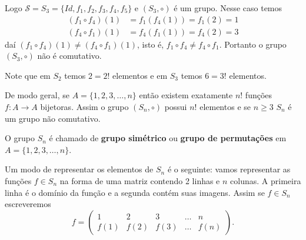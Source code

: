 Logo $\mathcal{S} = S_3 = \{Id, f_1, f_2, f_3, f_4, f_5\}$ e $(S_3, \circ)$ é um grupo. Nesse caso temos
\begin{align*}
    (f_1 \circ f_4)(1) &= f_1(f_4(1)) = f_1(2) = 1\\
    (f_4 \circ f_1)(1) &= f_4(f_1(1)) = f_4(2) = 3
\end{align*}
daí $(f_1 \circ f_4)(1) \ne (f_4 \circ f_1)(1)$, isto é, $f_1 \circ f_4 \ne f_4 \circ f_1$. Portanto o grupo $(S_3, \circ)$ não é comutativo.

Note que em $S_2$ temos $2 = 2!$ elementos e em $S_3$ temos $6 = 3!$ elementos.

De modo geral, se $A = \{1, 2, 3, \dots, n\}$ então existem exatamente $n!$ funções $f : A \to A$ bijetoras. Assim o grupo $(S_n, \circ)$ possui $n!$ elementos e se $n \geqslant 3$ $S_n$ é um grupo não comutativo.

\begin{definicao}
    O grupo $S_n$ é chamado de \textbf{grupo simétrico} ou \textbf{grupo de permutações} em $A = \{1, 2, 3, \dots, n\}$.
\end{definicao}


Um modo de representar os elementos de $S_n$ é o seguinte: vamos representar as funções $f \in S_n$ na forma de uma matriz contendo 2 linhas e $n$ colunas. A primeira linha é o domínio da função e a segunda contém suas imagens. Assim se $f \in S_n$ escreveremos
\[
    f = \begin{pmatrix}
        1 & 2 & 3 & \dots & n\\
        f(1) & f(2) & f(3) & \dots & f(n)
    \end{pmatrix}.
\]

